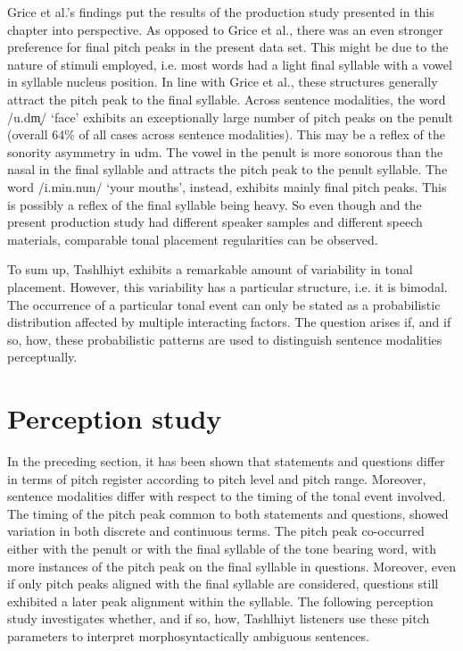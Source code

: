   \clearpage  
Grice et al.’s findings put the results of the production study presented in this chapter into perspective. As opposed to Grice et al., there was an even stronger preference for final pitch peaks in the present data set. This might be due to the nature of stimuli employed, i.e. most words had a light final syllable with a vowel in syllable nucleus position. In line with Grice et al., these structures generally attract the pitch peak to the final syllable. Across sentence modalities, the word /u.dm̩/ ‘face’ exhibits an exceptionally large number of pitch peaks on the penult (overall 64\% of all cases across sentence modalities). This may be a reflex of the sonority asymmetry in udm. The vowel in the penult is more sonorous than the nasal in the final syllable and attracts the pitch peak to the penult syllable. The word /i.min.nun/ ‘your mouths’, instead, exhibits mainly final pitch peaks. This is possibly a reflex of the final syllable being heavy. So even though \citet{Grice.etal2015tash} and the present production study had different speaker samples and different speech materials, comparable tonal placement regularities can be observed. 

To sum up, Tashlhiyt exhibits a remarkable amount of variability in tonal placement. However, this variability has a particular structure, i.e. it is bimodal. The occurrence of a particular tonal event can only be stated as a probabilistic distribution affected by multiple interacting factors. The question arises if, and if so, how, these probabilistic patterns are used to distinguish sentence modalities perceptually.

\section{Perception study}\label{sec:5.6}
In the preceding section, it has been shown that statements and questions differ in terms of pitch register according to pitch level and pitch range. Moreover, sentence modalities differ with respect to the timing of the tonal event involved. The timing of the pitch peak common to both statements and questions, showed variation in both discrete and continuous terms. The pitch peak co-occurred either with the penult or with the final syllable of the tone bearing word, with more instances of the pitch peak on the final syllable in questions. Moreover, even if only pitch peaks aligned with the final syllable are considered, questions still exhibited a later peak alignment within the syllable. The following perception study investigates whether, and if so, how, Tashlhiyt listeners use these pitch parameters to interpret morphosyntactically ambiguous sentences.

